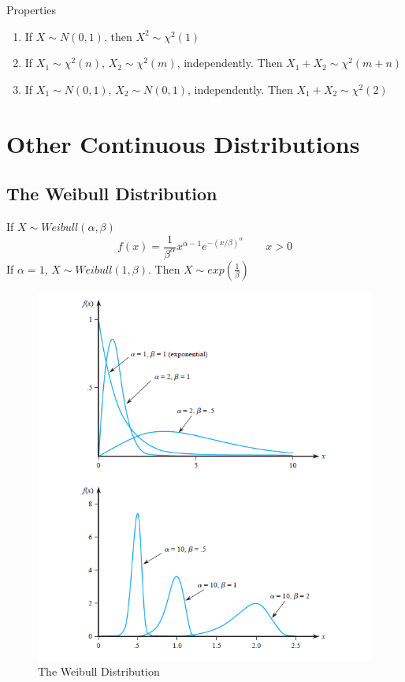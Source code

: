 \begin{prop}
Properties
\begin{enumerate}
\item If $X \sim N(0,1)$, then $X^2 \sim \chi^2 (1)$
\item If $X_1 \sim \chi^2 (n)$, $X_2 \sim \chi^2 (m)$, independently. Then $X_1+X_2 \sim \chi^2 (m+n)$ 
\item If $X_1 \sim N(0,1)$, $X_2 \sim N(0,1)$, independently. Then $X_1+X_2 \sim \chi^2 (2)$ 
\end{enumerate}
\end{prop}

\section{Other Continuous Distributions}
\subsection{The Weibull Distribution}
If $X \sim Weibull(\alpha,\beta)$
\[f(x)=\frac{1}{\beta^{\alpha}}x^{\alpha-1}e^{-(x/\beta)^{\alpha}} \qquad x >0\]
If $\alpha=1$, $X \sim Weibull(1,\beta)$. Then $X \sim exp(\frac{1}{\beta}) $

\begin{figure}[H]
\centering
\includegraphics[scale=1]{figures/Weibull.png}
\caption{The Weibull Distribution}
\end{figure}

